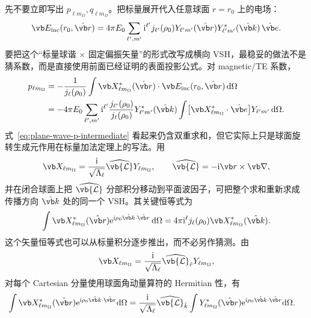 先不要立即写出 $p_{\ell m_{\Omega}},q_{\ell m_{\Omega}}$。把标量展开代入任意球面 $r=r_0$ 上的电场：
\begin{equation}
\vb E_{\rm inc}(r_0,\hat{\vb r})
=4\pi E_0\sum_{\ell',m'}
\ii^{\ell'}j_{\ell'}(\rho_0)
Y_{\ell'm'}(\hat{\vb r})
Y_{\ell'm'}^*(\hat{\vb k})\,\hat{\vb e}.
\label{eq:plane-wave-scalar-expanded-vector}
\end{equation}
要把这个“标量球谐 $\times$ 固定偏振矢量”的形式改写成横向 VSH，最稳妥的做法不是猜系数，而是直接使用前面已经证明的表面投影公式。对 magnetic/TE 系数，
\begin{align}
p_{\ell m_{\Omega}}
&=-\frac{1}{j_\ell(\rho_0)}
\int\vb X_{\ell m_{\Omega}}^*(\hat{\vb r})\cdot
\vb E_{\rm inc}(r_0,\hat{\vb r})\,\dd\Omega\\
&=-4\pi E_0\sum_{\ell',m'}
\ii^{\ell'}\frac{j_{\ell'}(\rho_0)}{j_\ell(\rho_0)}
Y_{\ell'm'}^*(\hat{\vb k})
\int
\bigl[\vb X_{\ell m_{\Omega}}^*\cdot\hat{\vb e}\bigr]
Y_{\ell'm'}\,\dd\Omega.
\label{eq:plane-wave-p-intermediate}
\end{align}
式~\cref{eq:plane-wave-p-intermediate} 看起来仍含双重求和，但它实际上只是球面旋转生成元作用在标量加法定理上的写法。用
\begin{equation}
\vb X_{\ell m_{\Omega}}
=\frac{\ii}{\sqrt{\Lambda_\ell}}
\widehat{\vb{\mathcal L}}Y_{\ell m_{\Omega}},
\qquad
\widehat{\vb{\mathcal L}}=-\ii\vb r\times\vb\nabla,
\end{equation}
并在闭合球面上把 $\widehat{\vb{\mathcal L}}$ 分部积分移动到平面波因子，可把整个求和重新求成传播方向 $\hat{\vb k}$ 处的同一个 VSH。其关键恒等式为
\begin{equation}
\int\vb X_{\ell m_{\Omega}}^*(\hat{\vb r})
\ee^{\ii\rho_0\hat{\vb k}\cdot\hat{\vb r}}\,\dd\Omega
=4\pi\ii^\ell j_\ell(\rho_0)
\vb X_{\ell m_{\Omega}}^*(\hat{\vb k}).
\label{eq:vector-plane-wave-X-integral}
\end{equation}
这个矢量恒等式也可以从标量积分逐步推出，而不必另作猜测。由
\begin{equation}
\vb X_{\ell m_\Omega}
=\frac{\ii}{\sqrt{\Lambda_\ell}}\widehat{\vb{\mathcal L}}_{\hat r}Y_{\ell m_\Omega},
\end{equation}
对每个 Cartesian 分量使用球面角动量算符的 Hermitian 性，有
\begin{align}
\int \vb X_{\ell m_\Omega}^*(\hat{\vb r})
\ee^{\ii\rho_0\hat{\vb k}\cdot\hat{\vb r}}\dd\Omega
&=\frac{\ii}{\sqrt{\Lambda_\ell}}
\widehat{\vb{\mathcal L}}_{\hat k}
\int Y_{\ell m_\Omega}^*(\hat{\vb r})
\ee^{\ii\rho_0\hat{\vb k}\cdot\hat{\vb r}}\dd\Omega.
\label{eq:X-integral-angular-momentum-step}
\end{align}
